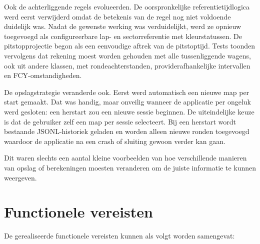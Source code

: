 Ook de achterliggende regels evolueerden. De oorspronkelijke referentietijdlogica werd eerst
verwijderd omdat de betekenis van de regel nog niet voldoende duidelijk was. Nadat de gewenste
werking was verduidelijkt, werd ze opnieuw toegevoegd als configureerbare lap- en sectorreferentie
met kleurstatussen. De pitstopprojectie begon als een eenvoudige aftrek van de pitstoptijd. Tests
toonden vervolgens dat rekening moest worden gehouden met alle tussenliggende wagens, ook uit andere
klassen, met rondeachterstanden, providerafhankelijke intervallen en FCY-omstandigheden.

De opslagstrategie veranderde ook. Eerst werd automatisch een nieuwe map per start gemaakt. Dat
was handig, maar onveilig wanneer de applicatie per ongeluk werd gesloten: een herstart zou een
nieuwe sessie beginnen. De uiteindelijke keuze is dat de gebruiker zelf een map per sessie
selecteert. Bij een herstart wordt bestaande JSONL-historiek geladen en worden alleen nieuwe ronden
toegevoegd waardoor de applicatie na een crash of sluiting gewoon verder kan gaan.

Dit waren slechts een aantal kleine voorbeelden van hoe verschillende manieren van opslag of berekeningen moesten veranderen om de juiste informatie te kunnen weergeven.

\section{Functionele vereisten}
De gerealiseerde functionele vereisten kunnen als volgt worden samengevat:

